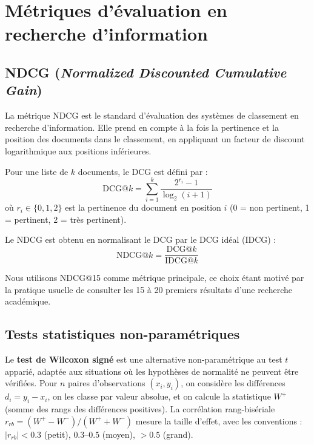 \section{Métriques d'évaluation en recherche d'information}

\subsection{NDCG (\textit{Normalized Discounted Cumulative Gain})}

La métrique NDCG \cite{jarvelin2002cumulated} est le standard d'évaluation
des systèmes de classement en recherche d'information. Elle prend en compte
à la fois la pertinence et la position des documents dans le classement,
en appliquant un facteur de discount logarithmique aux positions inférieures.

Pour une liste de $k$ documents, le DCG est défini par :
\begin{equation}
  \text{DCG}@k = \sum_{i=1}^{k} \frac{2^{r_i} - 1}{\log_2(i+1)}
  \label{eq:dcg}
\end{equation}
où $r_i \in \{0, 1, 2\}$ est la pertinence du document en position $i$
(0 = non pertinent, 1 = pertinent, 2 = très pertinent).

Le NDCG est obtenu en normalisant le DCG par le DCG idéal (IDCG) :
\begin{equation}
  \text{NDCG}@k = \frac{\text{DCG}@k}{\text{IDCG}@k}
  \label{eq:ndcg}
\end{equation}

Nous utilisons NDCG@15 comme métrique principale, ce choix étant motivé
par la pratique usuelle de consulter les 15 à 20 premiers résultats d'une
recherche académique.

\subsection{Tests statistiques non-paramétriques}
\label{sec:etat_art_wilcoxon}

Le \textbf{test de Wilcoxon signé} \cite{wilcoxon1945individual} est une
alternative non-paramétrique au test $t$ apparié, adaptée aux situations
où les hypothèses de normalité ne peuvent être vérifiées. Pour $n$ paires
d'observations $(x_i, y_i)$, on considère les différences $d_i = y_i - x_i$,
on les classe par valeur absolue, et on calcule la statistique $W^+$ (somme
des rangs des différences positives). La corrélation rang-bisériale
$r_{rb} = (W^+ - W^-) / (W^+ + W^-)$ mesure la taille d'effet, avec les
conventions : $|r_{rb}| < 0.3$ (petit), $0.3$--$0.5$ (moyen), $> 0.5$ (grand).

